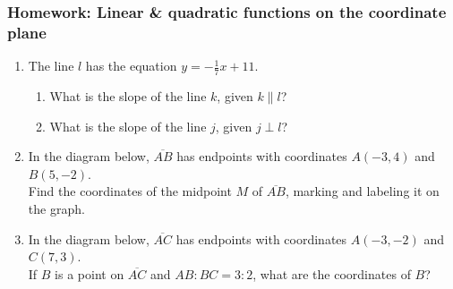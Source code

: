 \documentclass[12pt, twoside]{article}
\begin{document}
\subsubsection*{Homework: Linear \& quadratic functions on the coordinate plane}
  \begin{enumerate}

  \item The line $l$ has the equation $y=-\frac{1}{7}x+11$.
    \begin{enumerate}
      \item What is the slope of the line $k$, given $k \parallel l$?
      \vspace{0.5cm}
      \item What is the slope of the line $j$, given $j \perp l$?
      \vspace{0.5cm}
    \end{enumerate}

  \item In the diagram below, $\overline{AB}$ has endpoints with coordinates $A(-3,4)$ and $B(5, -2)$.\\[0.25cm]
  Find the coordinates of the midpoint $M$ of $\overline{AB}$, marking and labeling it on the graph.
    \begin{flushright} %
    \end{flushright}

  \item In the diagram below, $\overline{AC}$ has endpoints with coordinates $A(-3,-2)$ and $C(7, 3)$.\\[0.25cm]
  If $B$ is a point on $\overline{AC}$ and $AB {:} BC = 3{:}2$,  what  are  the coordinates of $B$?
    \begin{flushright} %
    \end{flushright}


\end{enumerate}
\end{document}
